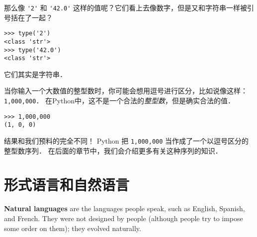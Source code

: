 那么像 \lstinline{'2'} 和 \lstinline{'42.0'} 这样的值呢？它们看上去像数字，但是又和字符串一样被引号括在了一起？
  

\begin{lstlisting}
>>> type('2')
<class 'str'>
>>> type('42.0')
<class 'str'>
\end{lstlisting}

%

它们其实是字符串．


当你输入一个大数值的整型数时，你可能会想用逗号进行区分，比如说像这样：\lstinline{1,000,000}． 在Python中，这不是一个合法的{\em 整型数}，但是确实合法的值．

\begin{lstlisting}
>>> 1,000,000
(1, 0, 0)
\end{lstlisting}
%

结果和我们预料的完全不同！ Python 把 \lstinline{1,000,000} 当作成了一个以逗号区分的整型数序列． 在后面的章节中，我们会介绍更多有关这种序列的知识．



\section{形式语言和自然语言}
  
  
  
  


{\bf Natural languages} are the languages people speak,
such as English, Spanish, and French.  They were not designed
by people (although people try to impose some order on them);
they evolved naturally.

